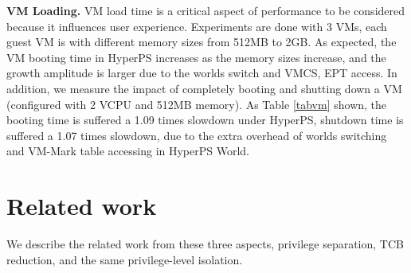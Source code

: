 \documentclass[conference]{IEEEtran}
\begin{document}
\textbf {VM Loading.}
VM load time is a critical aspect of performance to be considered because it influences user experience.
 Experiments are done with 3 VMs, each guest VM is with different memory sizes from 512MB to 2GB.
 As expected, the VM booting time in HyperPS increases as the memory sizes increase, and the growth amplitude is larger due to the worlds switch and VMCS, EPT access.
In addition, we measure the impact of completely booting and shutting down a VM (configured with 2 VCPU and 512MB memory). As Table \ref{tabvm} shown, the booting time is suffered a 1.09 times slowdown under HyperPS, shutdown time is suffered a 1.07 times slowdown, due to the extra overhead of worlds switching and VM-Mark table accessing in HyperPS World. %

\section{Related work}\label{sec:related}
We describe the related work from these three aspects,
privilege separation, TCB reduction, and the same privilege-level isolation.

\iffalse
\end{document}
